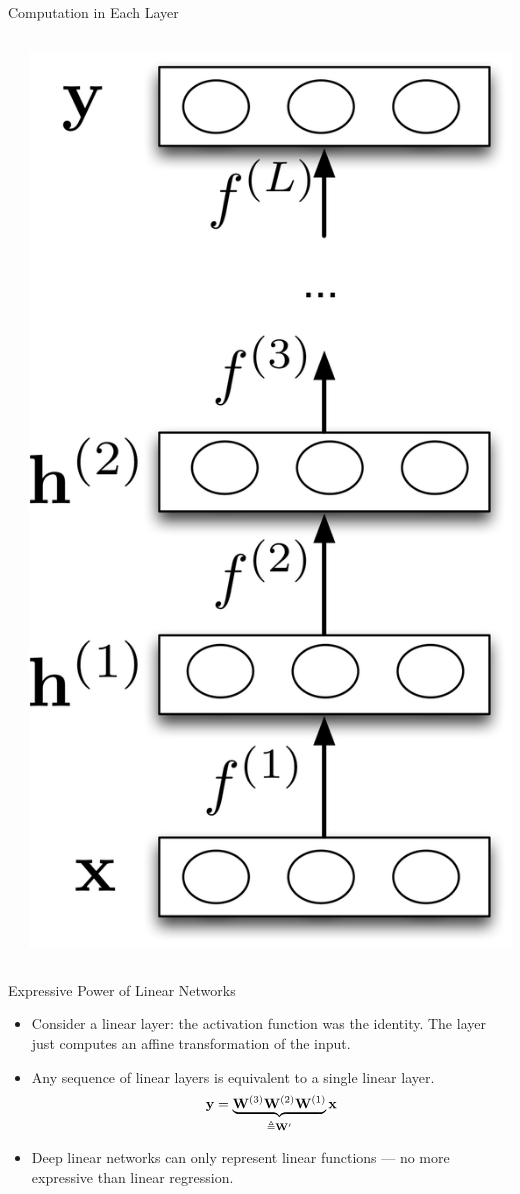 \documentclass[handout,aspectratio=169]{beamer}
\begin{document}
\begin{frame}{Computation in Each Layer}
\begin{columns}
\begin{column}{0.75\linewidth}
\end{column}
\begin{column}{0.35\linewidth}
    \centering
      \includegraphics[width=.7\linewidth]{pics/layer_functions.png}
\end{column}
\end{columns}
\end{frame}


\begin{frame}{Expressive Power of Linear Networks}
  \begin{itemize}
  \setlength\itemsep{1em}
  \item Consider a linear layer: the activation function was the identity. The layer just computes an affine transformation of the input.
  \item Any sequence of linear layers is equivalent to a single linear layer.
    \[ \mathbf{y} = \underbrace{\mathbf{W}^{(3)} \mathbf{W}^{(2)} \mathbf{W}^{(1)}}_{\triangleq \mathbf{W}^\prime} {\bf x} \]
\item Deep linear networks can only represent linear functions 
--- no more expressive than linear regression.
  \end{itemize}
\end{frame}
\end{document}
